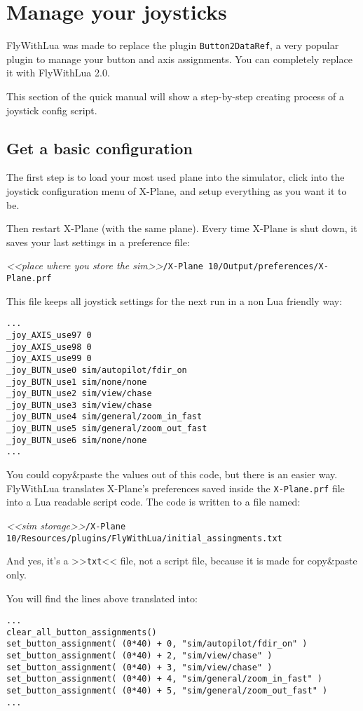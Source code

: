 \documentclass[11pt,parskip=half,a4paper]{scrartcl}
\begin{document}
\section{Manage your joysticks}

FlyWithLua was made to replace the plugin \verb|Button2DataRef|, a very popular plugin to manage your button and axis assignments. You can completely replace it with FlyWithLua 2.0.

This section of the quick manual will show a step-by-step creating process of a joystick config script.

\subsection{Get a basic configuration}

The first step is to load your most used plane into the simulator, click into the joystick configuration menu of X-Plane, and setup everything as you want it to be.

Then restart X-Plane (with the same plane). Every time X-Plane is shut down, it saves your last settings in a preference file:

\emph{<<place where you store the sim>>}\verb|/X-Plane 10/Output/preferences/X-Plane.prf|

This file keeps all joystick settings for the next run in a non Lua friendly way:

\begin{lstlisting}[firstnumber=1680]
...
_joy_AXIS_use97 0
_joy_AXIS_use98 0
_joy_AXIS_use99 0
_joy_BUTN_use0 sim/autopilot/fdir_on
_joy_BUTN_use1 sim/none/none
_joy_BUTN_use2 sim/view/chase
_joy_BUTN_use3 sim/view/chase
_joy_BUTN_use4 sim/general/zoom_in_fast
_joy_BUTN_use5 sim/general/zoom_out_fast
_joy_BUTN_use6 sim/none/none
...
\end{lstlisting}


You could copy\&paste the values out of this code, but there is an easier way. FlyWithLua translates X-Plane's preferences saved inside the \verb|X-Plane.prf| file into a Lua readable script code. The code is written to a file named:

\emph{<<sim storage>>}\verb|/X-Plane 10/Resources/plugins/FlyWithLua/initial_assingments.txt|

And yes, it's a >>\verb|txt|<< file, not a script file, because it is made for copy\&paste only.

You will find the lines above translated into:

\begin{lstlisting}[firstnumber=12]
...
clear_all_button_assignments()
set_button_assignment( (0*40) + 0, "sim/autopilot/fdir_on" )
set_button_assignment( (0*40) + 2, "sim/view/chase" )
set_button_assignment( (0*40) + 3, "sim/view/chase" )
set_button_assignment( (0*40) + 4, "sim/general/zoom_in_fast" )
set_button_assignment( (0*40) + 5, "sim/general/zoom_out_fast" )
...
\end{lstlisting}
\end{document}
